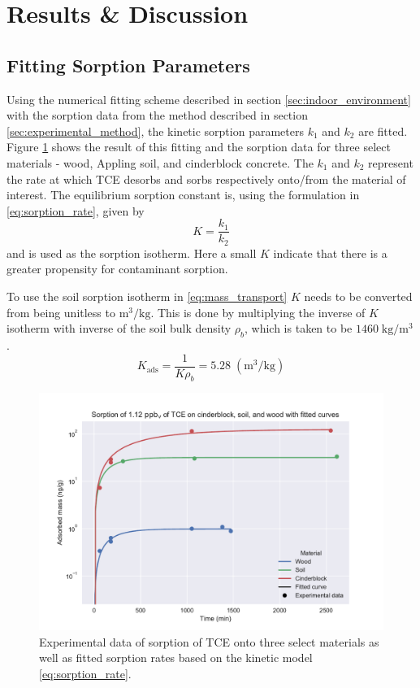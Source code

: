 \section{Results \& Discussion}\label{sec:results}

\subsection{Fitting Sorption Parameters}\label{sec:results_sorption_fit}

Using the numerical fitting scheme described in section \ref{sec:indoor_environment} with the sorption data from the method described in section \ref{sec:experimental_method}, the kinetic sorption parameters $k_1$ and $k_2$ are fitted.
Figure \ref{fig:sorption_fit} shows the result of this fitting and the sorption data for three select materials - wood, Appling soil, and cinderblock concrete.
The $k_1$ and $k_2$ represent the rate at which TCE desorbs and sorbs respectively onto/from the material of interest.
The equilibrium sorption constant is, using the formulation in \eqref{eq:sorption_rate}, given by
\begin{equation}
  K = \frac{k_1}{k_2}
\end{equation}
and is used as the sorption isotherm.
Here a small $K$ indicate that there is a greater propensity for contaminant sorption.\par

To use the soil sorption isotherm in \eqref{eq:mass_transport} $K$ needs to be converted from being unitless to $\mathrm{m^3/kg}$.
This is done by multiplying the inverse of $K$ isotherm with inverse of the soil bulk density $\rho_b$, which is taken to be $1460 \; \mathrm{kg/m^3}$.
\begin{equation}
  K_\mathrm{ads} = \frac{1}{K \rho_b} = 5.28 \; \mathrm{(m^3/kg)}
\end{equation}

\begin{figure}[htb!]
  \includegraphics[width=\textwidth]{sorption_fit.pdf}
  \caption{Experimental data of sorption of TCE onto three select materials as well as fitted sorption rates based on the kinetic model \eqref{eq:sorption_rate}.}
  \label{fig:sorption_fit}
\end{figure}

